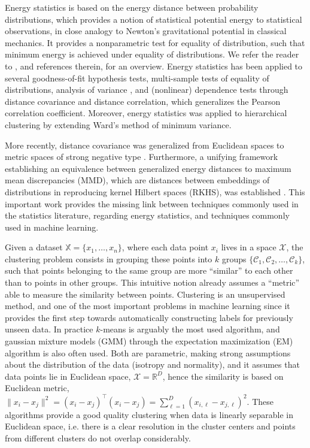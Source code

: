 \documentclass[aps,preprint,nofootinbib,floatfix]{revtex4-1}
\newcommand\C{{\mathcal{C}}}
\begin{document}
Energy statistics is based on the energy distance between probability
distributions, which provides a notion of statistical potential energy
to statistical observations, in close analogy to Newton's gravitational
potential in classical mechanics. 
It provides a nonparametric test for equality of distribution,
such that minimum energy is achieved under equality of 
distributions. 
We refer the reader 
to \cite{Szkely2013}, and references therein, for an overview.
Energy statistics has been applied to several goodness-of-fit 
hypothesis tests, 
multi-sample tests of equality of distributions, analysis of variance
\cite{RizzoVariance}, and (nonlinear)
dependence tests through
distance covariance and distance correlation, which generalizes the Pearson
correlation coefficient. 
Moreover, energy statistics  was applied
to hierarchical clustering \cite{RizzoClustering} by extending Ward's
method of minimum variance.

More recently, distance covariance was 
generalized from Euclidean
spaces to metric spaces of strong negative type \cite{Lyons}.
Furthermore, a unifying framework establishing an equivalence
between generalized energy distances to maximum
mean discrepancies (MMD), which are distances between embeddings of
distributions in reproducing kernel Hilbert spaces (RKHS), was
established \cite{Sejdinovic2013}. This important work provides the missing
link
between techniques commonly used in the statistics literature, regarding
energy statistics, and techniques
commonly used in machine learning.

Given a dataset $\mathbb{X} = \{x_1,\dotsc,x_n \}$, where each
data point $x_i$ lives in a space $\mathcal{X}$, the clustering
problem consists in grouping these points into $k$ groups $\{
\C_1,\C_2,\dotsc,\C_k \}$, such that
points belonging to the same group are more ``similar'' to each other
than to points in  other groups. This intuitive notion already assumes
a ``metric'' able to measure the similarity between points. Clustering
is an unsupervised method, and one of the most important problems in machine
learning since it provides the first step towards automatically constructing
labels for previously unseen data. In practice
$k$-means is arguably the most used algorithm, and gaussian 
mixture models (GMM) through the expectation
maximization (EM) algorithm is also often used. Both are parametric, making 
strong assumptions about
the distribution of the data (isotropy and normality), and it assumes
that data points
lie in Euclidean space, $\mathcal{X} = \mathbb{R}^D$, hence
the similarity is based on Euclidean metric, 
$\| x_i - x_j \|^2 = (x_i - x_j)^\top(x_i-x_j) = 
\sum_{\ell=1}^D (x_{i,\ell} - x_{j,\ell})^2$. These algorithms provide
a good quality clustering when data is linearly separable in Euclidean space,
i.e. there is a clear resolution in the cluster centers
and points from different clusters do not overlap considerably.
\end{document}
